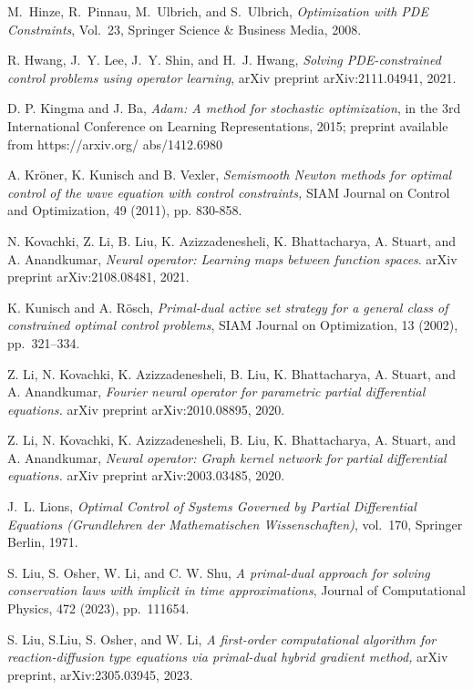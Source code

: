 \documentclass[final]{siamart171218}
\theoremstyle{remark}
\begin{document}
\begin{thebibliography}{10}
	{ M.~Hinze, R.~Pinnau, M.~Ulbrich, and S.~Ulbrich}, {\em Optimization with
		PDE Constraints}, Vol.~23, Springer Science \& Business Media, 2008.
	
	R.  Hwang, J.~Y. Lee, J.~Y. Shin,  and H.~J. Hwang,
{\em Solving PDE-constrained control problems using operator learning}, arXiv preprint arXiv:2111.04941, 2021.
	
	
	D. P. Kingma and J. Ba, {\em Adam: A method for stochastic optimization}, in the 3rd International
	Conference on Learning Representations, 2015; preprint available from https://arxiv.org/
	abs/1412.6980
	
	A. Kr{\"o}ner, K. Kunisch and B. Vexler, {\em Semismooth Newton methods for optimal
	control of the wave equation with control constraints,} SIAM Journal on Control and Optimization, 49
	(2011), pp. 830-858.
	
	N. Kovachki, Z. Li, B. Liu, K. Azizzadenesheli,
	K. Bhattacharya, A. Stuart, and A. Anandkumar, {\em Neural operator: Learning
	maps between function spaces}. arXiv preprint arXiv:2108.08481, 2021.
	
{  K. Kunisch and  A. R{\"o}sch},  \emph{Primal-dual active set strategy for a general class of constrained optimal control problems}, SIAM Journal on Optimization, 13 (2002), pp.~321--334.
	
	Z. Li, N. Kovachki, K. Azizzadenesheli, B. Liu, K. Bhattacharya, A. Stuart, and A. Anandkumar, {\em Fourier neural operator for parametric partial differential equations.} arXiv preprint arXiv:2010.08895, 2020.
	
	Z. Li, N. Kovachki, K. Azizzadenesheli, B. Liu, K. Bhattacharya, A. Stuart, and A. Anandkumar,  {\em Neural operator: Graph kernel network for partial differential equations.} arXiv preprint arXiv:2003.03485, 2020.
	
	{ J.~L. Lions}, {\em Optimal Control of Systems Governed by Partial
		Differential Equations (Grundlehren der Mathematischen Wissenschaften)},
	vol.~170, Springer Berlin, 1971.
	
	S. Liu, S. Osher, W. Li, and C. W.  Shu,  {\em A primal-dual approach for solving conservation laws with implicit in time approximations}, Journal of Computational Physics, 472 (2023), pp.~111654.
	
   S. Liu, S.Liu, S. Osher, and W. Li,  {\em A first-order computational algorithm for reaction-diffusion type equations via primal-dual hybrid gradient method,} arXiv preprint, arXiv:2305.03945, 2023.
	

\end{thebibliography}
\end{document}
